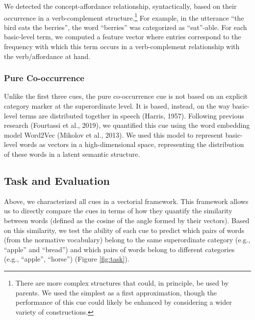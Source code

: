 \documentclass[english,,man,floatsintext]{apa6}
\begin{document}
We detected the concept-affordance relationship, syntactically, based on their occurrence in a verb-complement structure.\footnote{There are more complex structures that could, in principle, be used by parents. We used the simplest as a first approximation, though the performance of this cue could likely be enhanced by considering a wider variety of constructions.} For example, in the utterance \enquote{the bird eats the berries}, the word \enquote{berries} was categorized as \enquote{eat}-able. For each basic-level term, we computed a feature vector where entries correspond to the frequency with which this term occurs in a verb-complement relationship with the verb/affordance at hand.

\hypertarget{pure-co-occurrence}{%
\subsubsection{Pure Co-occurrence}\label{pure-co-occurrence}}

Unlike the first three cues, the pure co-occurrence cue is not based on an explicit category marker at the superordinate level. It is based,
instead, on the way basic-level terms are distributed together in speech (Harris, 1957). Following previous research (Fourtassi et al., 2019), we quantified this cue using the word embedding model Word2Vec (Mikolov et al., 2013). We used this model to represent basic-level words as vectors in a high-dimensional space, representing the distribution of these words in a latent semantic structure.

\hypertarget{task-and-evaluation}{%
\subsection{Task and Evaluation}\label{task-and-evaluation}}

Above, we characterized all cues in a vectorial framework. This
framework allows us to directly compare the cues in terms of how they
quantify the similarity between words (defined as the cosine of the
angle formed by their vectors). Based on this similarity, we test the
ability of each cue to predict which pairs of words (from the normative vocabulary) belong to the same superordinate category (e.g., \enquote{apple} and \enquote{bread}) and which pairs
of words belong to different categories (e.g., \enquote{apple}, \enquote{horse})
(Figure \ref{fig:task}).
\end{document}
